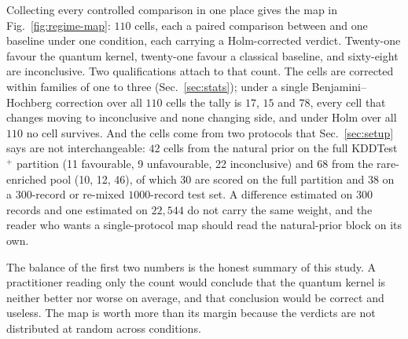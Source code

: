 %





Collecting every controlled comparison in one place gives the map in
Fig.~\ref{fig:regime-map}: $110$ cells, each a paired comparison between
\QSVM{} and one baseline under one condition, each carrying a Holm-corrected
verdict. Twenty-one favour the quantum kernel, twenty-one favour a classical
baseline, and sixty-eight are inconclusive. Two qualifications attach to that
count. The cells are corrected within families of one to three
(Sec.~\ref{sec:stats}); under a single Benjamini--Hochberg correction over all
$110$ cells the tally is $17$, $15$ and $78$, every cell that changes moving to
inconclusive and none changing side, and under Holm over all $110$ no cell
survives. And the cells come from two protocols that Sec.~\ref{sec:setup} says
are not interchangeable: $42$ cells from the natural prior on the full
KDDTest$^+$ partition (11 favourable, 9 unfavourable, 22 inconclusive) and $68$
from the rare-enriched pool (10, 12, 46), of which $30$ are scored on the full
partition and $38$ on a $300$-record or re-mixed $1000$-record test set. A
difference estimated on $300$ records and one estimated on $22{,}544$ do not
carry the same weight, and the reader who wants a single-protocol map should
read the natural-prior block on its own.

The balance of the first two numbers is the honest summary of this study. A
practitioner reading only the count would conclude that the quantum kernel is
neither better nor worse on average, and that conclusion would be correct and
useless. The map is worth more than its margin because the verdicts are not
distributed at random across conditions.

